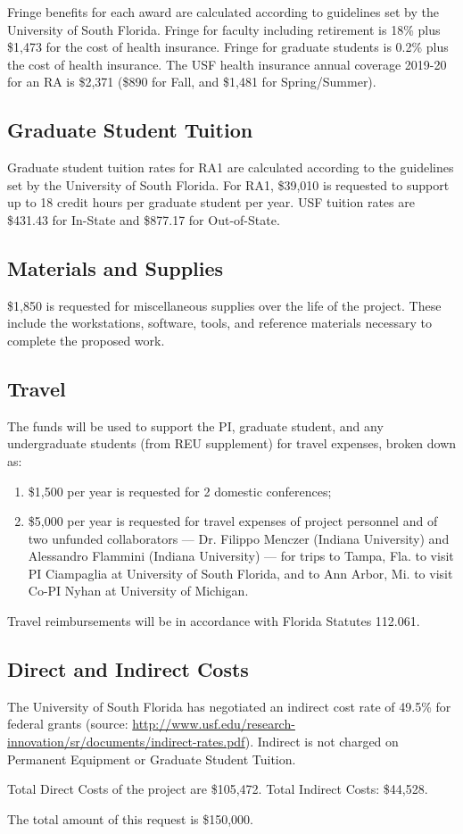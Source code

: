 Fringe benefits for each award are calculated according to guidelines set by the University of South Florida. Fringe for faculty including retirement is 18\% plus \$1,473 for the cost of health insurance. Fringe for graduate students is 0.2\% plus the cost of health insurance. The USF health insurance annual coverage 2019-20 for an RA is \$2,371 (\$890 for Fall, and \$1,481 for Spring/Summer). 

\subsection*{Graduate Student Tuition}

Graduate student tuition rates for RA1 are calculated according to the guidelines set by the University of South Florida. For RA1, \$39,010 is requested to support up to 18 credit hours per graduate student per year. USF tuition rates are \$431.43 for In-State and \$877.17 for Out-of-State.

\subsection*{Materials and Supplies}

\$1,850 is requested for miscellaneous supplies over the life of the project. These include the workstations, software, tools, and reference materials necessary to complete the proposed work.

\subsection*{Travel}

The funds will be used to support the PI, graduate student, and any undergraduate students (from REU supplement) for travel expenses, broken down as:
\begin{enumerate}
    \item  \$1,500 per year is requested for 2 domestic conferences; \item \$5,000 per year is requested for travel expenses of project personnel and of two unfunded collaborators --- Dr. Filippo Menczer (Indiana University) and Alessandro Flammini (Indiana University) --- for trips to Tampa, Fla. to visit PI Ciampaglia at University of South Florida, and to Ann Arbor, Mi. to visit Co-PI Nyhan at University of Michigan.   
\end{enumerate}

Travel reimbursements will be in accordance with Florida Statutes 112.061.

\subsection{Direct and Indirect Costs}

The University of South Florida has negotiated an indirect cost rate of 49.5\% for federal grants (source: \url{http://www.usf.edu/research-innovation/sr/documents/indirect-rates.pdf}). Indirect is not charged on Permanent Equipment or Graduate Student Tuition. 

Total Direct Costs of the project are \$105,472. Total Indirect Costs: \$44,528.

The total amount of this request is \$150,000.

